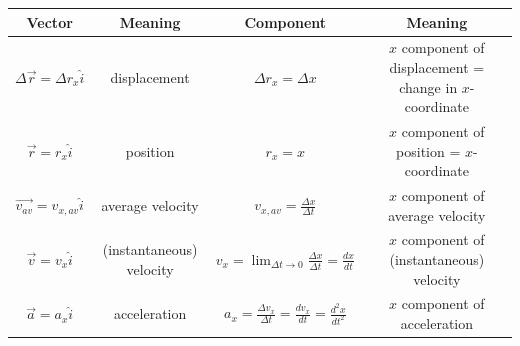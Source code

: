     \begin{center}
        \begin{tabular}{|c|c|c|c|}
            \hline
            \textbf{Vector} & \textbf{Meaning} & \textbf{Component} & \textbf{Meaning} \\
            \hline
            $\Delta \overrightarrow{r} = \Delta r_x \hat{i}$    & displacement & $\Delta r_x = \Delta x$    & $x$ component of displacement = change in $x$-coordinate \\
            \hline
            $\overrightarrow{r} = r_x \hat{i}$  & position & $r_x = x$  & $x$ component of position = $x$-coordinate \\
            \hline
            $\overrightarrow{v_{av}}=v_{x,av}\hat{i}$ & average velocity & $v_{x,av} = \frac{\Delta x}{\Delta t}$ & $x$ component of average velocity \\
            \hline
            $\overrightarrow{v} = v_x \hat{i}$ & (instantaneous) velocity   & $v_x = \lim_{\Delta t\to 0} \frac{\Delta x}{\Delta t} = \frac{dx}{dt}$ & $x$ component of (instantaneous) velocity \\
            \hline
            $\overrightarrow{a} = a_x \hat{i}$ & acceleration & $a_x = \frac{\Delta v_x}{\Delta t} = \frac{dv_x}{dt} = \frac{d^2 x}{dt^2}$ & $x$ component of acceleration \\
            \hline
        \end{tabular}
    \end{center}